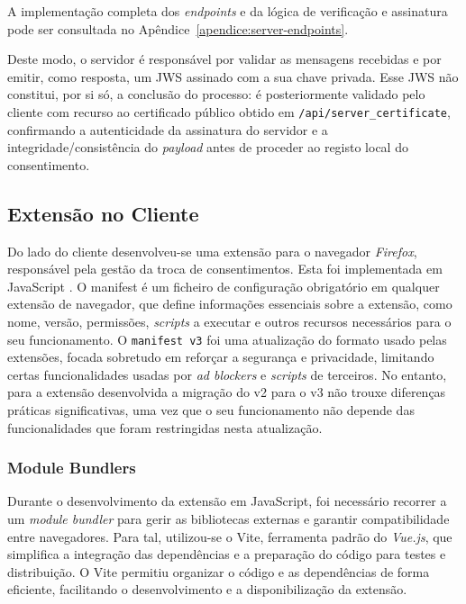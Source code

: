 A implementação completa dos \textit{endpoints} e da lógica de verificação e assinatura pode ser consultada no Apêndice~\ref{apendice:server-endpoints}.

Deste modo, o servidor é responsável por validar as mensagens recebidas e por emitir, como resposta, um JWS assinado com a sua chave privada. Esse JWS não constitui, por si só, a conclusão do processo: é posteriormente validado pelo cliente com recurso ao certificado público obtido em \texttt{/api/server\_certificate}, confirmando a autenticidade da assinatura do servidor e a integridade/consistência do \textit{payload} antes de proceder ao registo local do consentimento.

\subsection{Extensão no Cliente}
Do lado do cliente desenvolveu-se uma extensão para o navegador \textit{Firefox}, responsável pela gestão da troca de consentimentos. Esta foi implementada em JavaScript \citep{MozillaBrowserExtensions}. O manifest é um ficheiro de configuração obrigatório em qualquer extensão de navegador, que define informações essenciais sobre a extensão, como nome, versão, permissões, \textit{scripts} a executar e outros recursos necessários para o seu funcionamento. O \texttt{manifest v3} foi uma atualização do formato usado pelas extensões, focada sobretudo em reforçar a segurança e privacidade, limitando certas funcionalidades usadas por \textit{ad blockers} e \textit{scripts} de terceiros. No entanto, para a extensão desenvolvida a migração do v2 para o v3 não trouxe diferenças práticas significativas, uma vez que o seu funcionamento não depende das funcionalidades que foram restringidas nesta atualização.

\subsubsection{Module Bundlers}

Durante o desenvolvimento da extensão em JavaScript, foi necessário recorrer a um \textit{module bundler} para gerir as bibliotecas externas e garantir compatibilidade entre navegadores. Para tal, utilizou-se o Vite, ferramenta padrão do \textit{Vue.js}, que simplifica a integração das dependências e a preparação do código para testes e distribuição. O Vite permitiu organizar o código e as dependências de forma eficiente, facilitando o desenvolvimento e a disponibilização da extensão.

